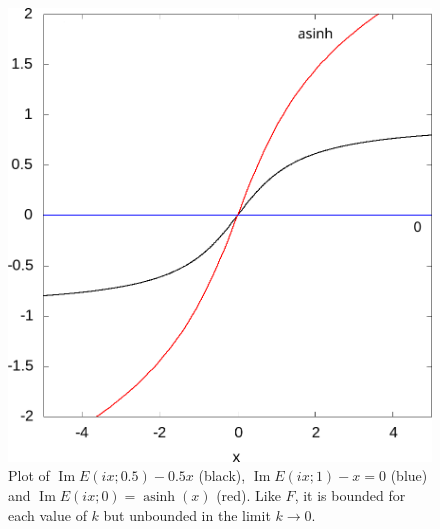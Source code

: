 \documentclass{article}
\numberwithin{equation}{section}
\numberwithin{figure}{section}
\DeclareMathOperator{\asinh}{asinh}
\DeclareMathOperator{\Imag}{Im}
\newcommand{\iu}{i}
\begin{document}
\begin{figure}
\includegraphics[height=0.3\textheight]{graphics/elliptic_bounds_E0.png}
\caption{Plot of $\Imag E(\iu x; 0.5) - 0.5x$ (black), $\Imag E(\iu x; 1) - x = 0$ (blue) and $\Imag E(\iu x; 0)=\asinh(x)$ (red). Like $F$, it is bounded for each value of $k$ but unbounded in the limit $k \to 0$.}
\end{figure}
\end{document}
